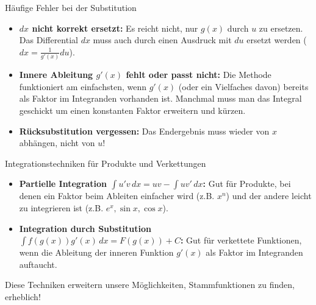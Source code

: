\begin{fehlerboxumgebung}{Häufige Fehler bei der Substitution}
\begin{itemize}
    \item \textbf{$dx$ nicht korrekt ersetzt:} Es reicht nicht, nur $g(x)$ durch $u$ zu ersetzen. Das Differential $dx$ muss auch durch einen Ausdruck mit $du$ ersetzt werden ($dx = \frac{1}{g'(x)}du$).
    \item \textbf{Innere Ableitung $g'(x)$ fehlt oder passt nicht:} Die Methode funktioniert am einfachsten, wenn $g'(x)$ (oder ein Vielfaches davon) bereits als Faktor im Integranden vorhanden ist. Manchmal muss man das Integral geschickt um einen konstanten Faktor erweitern und kürzen.
    \item \textbf{Rücksubstitution vergessen:} Das Endergebnis muss wieder von $x$ abhängen, nicht von $u$!
\end{itemize}
\end{fehlerboxumgebung}

\begin{kurzknappumgebung}{Integrationstechniken für Produkte und Verkettungen}
\begin{itemize}
    \item \textbf{Partielle Integration $\int u'v \,dx = uv - \int uv' \,dx$:}
        Gut für Produkte, bei denen ein Faktor beim Ableiten einfacher wird (z.B. $x^n$) und der andere leicht zu integrieren ist (z.B. $e^x, \sin x, \cos x$).
    \item \textbf{Integration durch Substitution $\int f(g(x))g'(x) \,dx = F(g(x))+C$:}
        Gut für verkettete Funktionen, wenn die Ableitung der inneren Funktion $g'(x)$ als Faktor im Integranden auftaucht.
\end{itemize}
Diese Techniken erweitern unsere Möglichkeiten, Stammfunktionen zu finden, erheblich!
\end{kurzknappumgebung}

